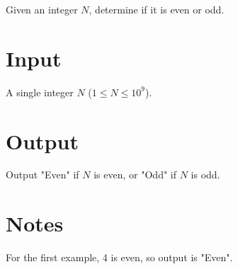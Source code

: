 
Given an integer $N$, determine if it is even or odd.

\section*{Input}
A single integer $N$ ($1 \le N \le 10^9$).

\section*{Output}
Output "Even" if $N$ is even, or "Odd" if $N$ is odd.

\section*{Notes}
For the first example, 4 is even, so output is "Even".
